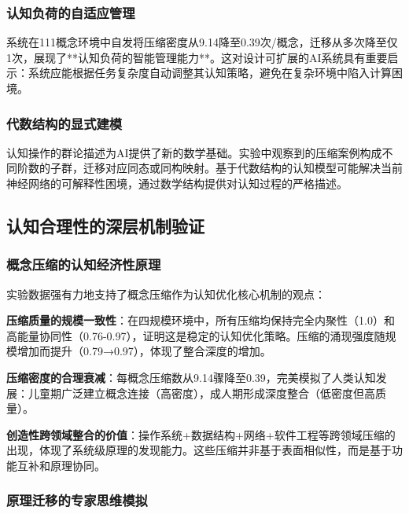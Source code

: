 \documentclass[12pt,a4paper]{article}
\begin{document}
\subsubsection{认知负荷的自适应管理}
系统在111概念环境中自发将压缩密度从9.14降至0.39次/概念，迁移从多次降至仅1次，展现了**认知负荷的智能管理能力**。这对设计可扩展的AI系统具有重要启示：系统应能根据任务复杂度自动调整其认知策略，避免在复杂环境中陷入计算困境。

\subsubsection{代数结构的显式建模}
认知操作的群论描述为AI提供了新的数学基础。实验中观察到的压缩案例构成不同阶数的子群，迁移对应同态或同构映射。基于代数结构的认知模型可能解决当前神经网络的可解释性困境，通过数学结构提供对认知过程的严格描述。

\subsection{认知合理性的深层机制验证}

\subsubsection{概念压缩的认知经济性原理}

实验数据强有力地支持了概念压缩作为认知优化核心机制的观点：

\textbf{压缩质量的规模一致性}：在四规模环境中，所有压缩均保持完全内聚性（1.0）和高能量协同性（0.76-0.97），证明这是稳定的认知优化策略。压缩的涌现强度随规模增加而提升（0.79→0.97），体现了整合深度的增加。

\textbf{压缩密度的合理衰减}：每概念压缩数从9.14骤降至0.39，完美模拟了人类认知发展：儿童期广泛建立概念连接（高密度），成人期形成深度整合（低密度但高质量）。

\textbf{创造性跨领域整合的价值}：操作系统+数据结构+网络+软件工程等跨领域压缩的出现，体现了系统级原理的发现能力。这些压缩并非基于表面相似性，而是基于功能互补和原理协同。

\subsubsection{原理迁移的专家思维模拟}
\end{document}

